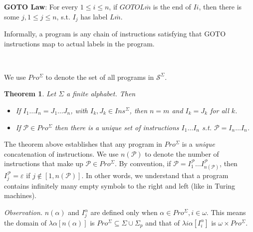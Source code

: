 \documentclass[a4paper, 12pt]{article}
\newtheorem{theorem}{Theorem}
\newtheorem{theorem}{Theorem}
\begin{document}
\textbf{GOTO Law}: For every $1 \leq i \leq n$, if $GOTOL \overline{m}$ is
the end of $Ii$, then there is some $j, 1 \leq j \leq n$, s.t. $I_j$ has label
$L \overline{m}$.

Informally, a program is any chain of instructions satisfying that GOTO
instructions map to actual labels in the program.

~ 

We use $Pro^{\Sigma}$ to denote the set of all programs in
$\mathcal{S}^{\Sigma}$.

\begin{theorem}
    Let $\Sigma$ a finite alphabet. Then 

    \begin{itemize}
        \item If $I_1 \ldots I_n = J_1 \ldots J_n$, with $I_k, J_k \in
            Ins^{\Sigma}$, then $n = m$ and $I_k = J_k$ for all $k$.
        \item If $\mathcal{P} \in Pro^{\Sigma}$ then there is a unique set of
            instructions $I_1 \ldots I_n$ s.t. $\mathcal{P} = I_n \ldots I_n$.
    \end{itemize}
\end{theorem}

The theorem above establishes that any program in $Pro^{\Sigma}$ is a
\textit{unique} concatenation of instructions. We use $n(\mathcal{P})$ to denote
the number of instructions that make up $\mathcal{P} \in Pro^{\Sigma}$. By
convention, if $\mathcal{P} = I^{\mathcal{P}}_1 \ldots
I^{\mathcal{P}}_{n(\mathcal{P})}$, then $I^{\mathcal{P}}_j =
\varepsilon$ if $j \not\in [1, n(\mathcal{P})]$. In other words, we understand that
a program contains infinitely many empty symbols to the right and left (like in
Turing machines).

\textit{Observation.} $n(\alpha)$ and $I_j^{\alpha}$ are defined only when
$\alpha \in Pro^{\Sigma}, i \in \omega$. This means the domain of $\lambda
\alpha[n(\alpha)]$ is $Pro^{\Sigma} \subseteq \Sigma \cup \Sigma_p$ and that of
$\lambda i\alpha[I_i^{\alpha}]$ is $\omega \times Pro^{\Sigma}$.
\end{document}
